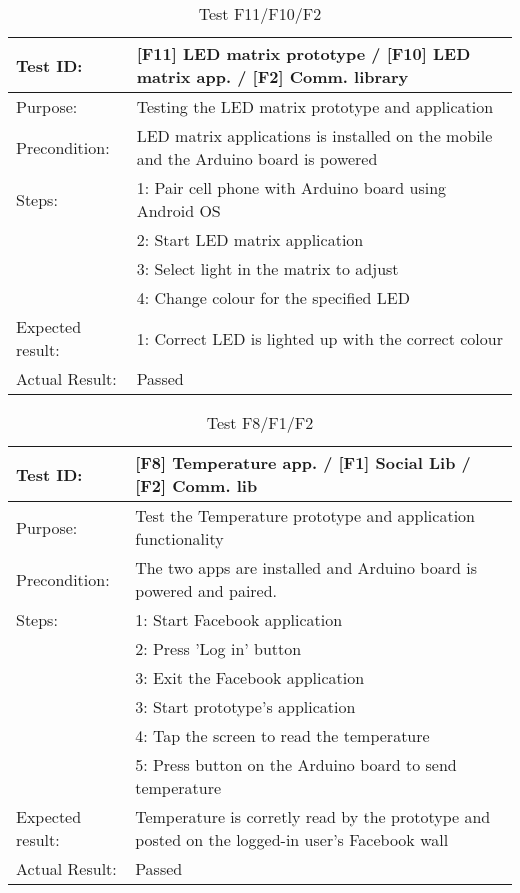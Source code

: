 \begin{table}[h!]
\begin{tabular}{|l|p{10cm}|}
\hline Test ID: &		[F11] LED matrix prototype / [F10] LED matrix app. /
						[F2] Comm. library \\
\hline Purpose: &		Testing the LED matrix prototype and application \\
\hline Precondition: &	LED matrix applications is installed on the mobile and
						the Arduino board is powered \\
\hline
Steps:
 & 1: Pair cell phone with Arduino board using Android OS \\
 & 2: Start LED matrix application \\
 & 3: Select light in the matrix to adjust\\
 & 4: Change colour for the specified LED \\
\hline
Expected result:
 & 1: Correct LED is lighted up with the correct colour\\
\hline
Actual Result: &  Passed \\
\hline
\end{tabular}
\caption{Test F11/F10/F2}
\label{tbl:f11f10f2test}
\end{table}


\begin{table}[h!]
\begin{tabular}{|l|p{10cm}|}
\hline Test ID: &		[F8] Temperature app. / [F1] Social Lib / [F2] Comm. lib \\
\hline Purpose: &		Test the Temperature prototype and application
						functionality  \\
\hline Precondition: &	The two apps are installed and Arduino board is powered
						and paired. \\
\hline
Steps:
  & 1: Start Facebook application \\
  & 2: Press 'Log in' button \\
  & 3: Exit the Facebook application \\
  & 3: Start prototype's application \\
  & 4: Tap the screen to read the temperature\\
  & 5: Press button on the Arduino board to send temperature \\
\hline
Expected result:
  & Temperature is corretly read by the prototype and posted on the logged-in
	user's Facebook wall \\
\hline
Actual Result:
  & Passed \\
\hline
\end{tabular}
\caption{Test F8/F1/F2}
\label{tbl:f8f1f2test}
\end{table}


